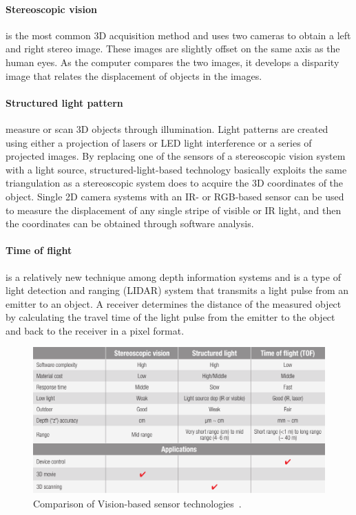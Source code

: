 \documentclass[UKenglish]{ifimaster}
\begin{document}
\paragraph{Stereoscopic vision}is the most common 3D acquisition method and uses two cameras to obtain a left and right stereo image. These images are slightly offset on the same axis as the human eyes. As the computer compares the two images, it develops a disparity image that relates the displacement of objects in the images.

\paragraph{Structured light pattern}measure or scan 3D objects through illumination. Light patterns are created using either a projection of lasers or LED light interference or a series of projected images. By
replacing one of the sensors of a stereoscopic vision system with a light source, structured-light-based technology basically exploits the same triangulation as a stereoscopic system does to acquire the 3D coordinates of the object. Single 2D camera systems with an IR- or RGB-based sensor can be used to measure the displacement of any single stripe of visible or IR light, and then the coordinates can be obtained through software analysis.

\paragraph{Time of flight}is a relatively new technique among depth information systems
and is a type of light detection and ranging (LIDAR) system that transmits a light pulse from an emitter to an object. A receiver determines the distance of the measured object by calculating the travel time of the light pulse from the emitter to the object and back to the receiver in a pixel format.

\begin{figure}%
	\includegraphics[width=\linewidth]{pictures/Vision-based_comparisons.png}
	\caption{Comparison of Vision-based sensor technologies~\citep{Ko2012}.}
	\label{fig:VBComparisions}
\end{figure} 
\end{document}
